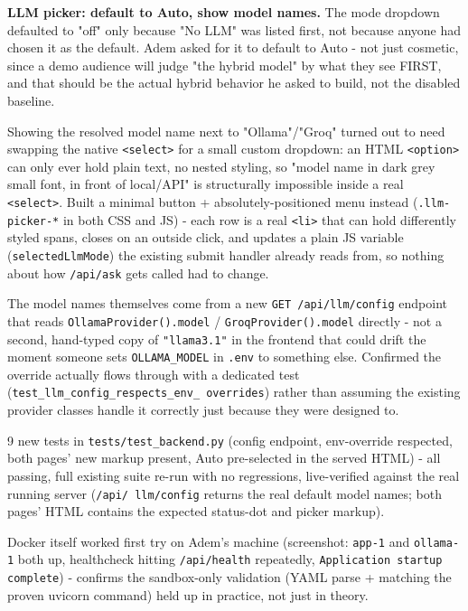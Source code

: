 \textbf{LLM picker: default to Auto, show model names.} The mode dropdown defaulted to "off" only because "No LLM" was listed first, not because anyone had chosen it as the default. Adem asked for it to default to Auto - not just cosmetic, since a demo audience will judge "the hybrid model" by what they see FIRST, and that should be the actual hybrid behavior he asked to build, not the disabled baseline.

Showing the resolved model name next to "Ollama"/"Groq" turned out to need swapping the native \texttt{<select>} for a small custom dropdown: an HTML \texttt{<option>} can only ever hold plain text, no nested styling, so "model name in dark grey small font, in front of local/API" is structurally impossible inside a real \texttt{<select>}. Built a minimal button + absolutely-positioned menu instead (\texttt{.llm-picker-*} in both CSS and JS) - each row is a real \texttt{<li>} that can hold differently styled spans, closes on an outside click, and updates a plain JS variable (\texttt{selectedLlmMode}) the existing submit handler already reads from, so nothing about how \texttt{/\allowbreak{}api/\allowbreak{}ask} gets called had to change.

The model names themselves come from a new \texttt{GET /\allowbreak{}api/\allowbreak{}llm/\allowbreak{}config} endpoint that reads \texttt{OllamaProvider().model} / \texttt{GroqProvider().model} directly - not a second, hand-typed copy of \texttt{"llama3.1"} in the frontend that could drift the moment someone sets \texttt{OLLAMA\_\allowbreak{}MODEL} in \texttt{.env} to something else. Confirmed the override actually flows through with a dedicated test (\texttt{test\_\allowbreak{}llm\_\allowbreak{}config\_\allowbreak{}respects\_\allowbreak{}env\_\allowbreak{} overrides}) rather than assuming the existing provider classes handle it correctly just because they were designed to.

9 new tests in \texttt{tests/\allowbreak{}test\_\allowbreak{}backend.py} (config endpoint, env-override respected, both pages' new markup present, Auto pre-selected in the served HTML) - all passing, full existing suite re-run with no regressions, live-verified against the real running server (\texttt{/\allowbreak{}api/\allowbreak{} llm/\allowbreak{}config} returns the real default model names; both pages' HTML contains the expected status-dot and picker markup).

Docker itself worked first try on Adem's machine (screenshot: \texttt{app-1} and \texttt{ollama-1} both up, healthcheck hitting \texttt{/\allowbreak{}api/\allowbreak{}health} repeatedly, \texttt{Application startup complete}) - confirms the sandbox-only validation (YAML parse + matching the proven uvicorn command) held up in practice, not just in theory.

